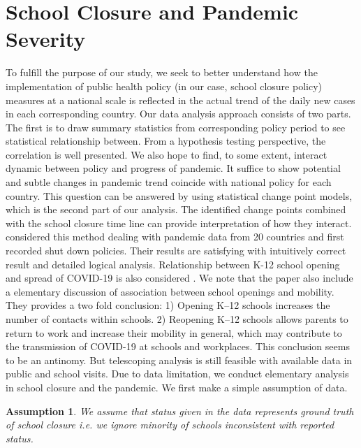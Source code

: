 \documentclass{article}
\newtheorem{assump}{Assumption}
\begin{document}
\section{School Closure and Pandemic Severity}
\label{closure}
To fulfill the purpose of our study, we seek to better understand how the implementation of public health policy (in our case, school closure policy) measures at a national scale is reflected in the actual trend of the daily new cases in each corresponding country. Our data analysis approach consists of two parts. The first is to draw summary statistics from corresponding policy period to see statistical relationship between. From a hypothesis testing perspective, the correlation is well presented. We also hope to find, to some extent, interact dynamic between policy and progress of pandemic. It suffice to show potential and subtle changes in pandemic trend coincide with national policy for each country. This question can be answered by using statistical change point models, which is the second part of our analysis. The identified change points combined with the school closure time line can provide interpretation of how they interact. \cite{COUGHLIN2021100064} considered this method dealing with pandemic data from 20 countries and first recorded shut down policies. Their results are satisfying with intuitively correct result and detailed logical analysis. Relationship between K-12 school opening and spread of COVID-19 is also considered \cite{Chernozhukove2103420118}. We note that the paper also include a elementary discussion of association between school openings and mobility. They provides a two fold conclusion: 1) Opening K–12 schools increases the number of contacts within schools. 2) Reopening K–12 schools allows parents to return to work and increase their mobility in general, which may contribute to the transmission of COVID-19 at schools and workplaces. This conclusion seems to be an antinomy. But telescoping analysis is still feasible with available data in public and school visits. Due to data limitation, we conduct elementary analysis in school closure and the pandemic. 
We first make a simple assumption of data.
\begin{assump}
We assume that status given in the data represents ground truth of school closure i.e. we ignore minority of schools inconsistent with reported status. 
\end{assump}
\end{document}
